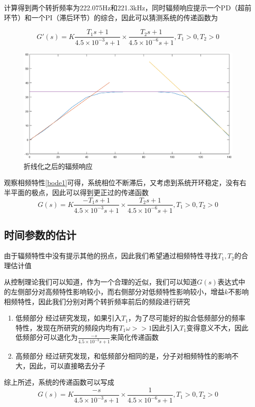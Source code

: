 \documentclass[UTF8,a4paper]{paper}
\begin{document}
计算得到两个转折频率为222.075Hz和221.3kHz，同时辐频响应提示一个PD（超前环节）和一个PI（滞后环节）的综合，因此可以猜测系统的传递函数为

\begin{equation}
G'(s)=K\frac{T_1s+1}{4.5\times10^{-3}s+1}\times\frac{T_2s+1}{4.5\times10^{-6}s+1}, T_1>0,T_2>0
\end{equation}
\begin{figure}
\includegraphics[width=\textwidth]{bode1.eps}
\caption{折线化之后的辐频响应}
\label{refin1}
\end{figure}
观察相频特性\ref{bode1}可得，系统相位不断滞后，又考虑到系统开环稳定，没有右半平面的极点，因此可以得到更正过的传递函数
\begin{equation}
G(s)=K\frac{-T_1s+1}{4.5\times10^{-3}s+1}\times\frac{T_2s+1}{4.5\times10^{-6}s+1}, T_1>0,T_2>0
\end{equation}
\subsection{时间参数的估计}
由于辐频特性中没有提示其他的拐点，因此我们希望通过相频特性寻找$T_1,T_2$的合理估计值

从控制理论我们可以知道，作为一个合理的近似，我们可以知道$G(s)$表达式中的左侧部分对高频特性影响较小，而右侧部分对低频特性影响较小，增益$k$不影响相频特性，因此我们分别对两个转折频率前后的频段进行研究

\begin{enumerate}
\item{低频部分}
经过研究发现，如果引入$T_1$，为了尽可能好的拟合低频部分的频率特性，发现在所研究的频段内均有$T_1\omega >> 1 $因此引入$T_1$变得意义不大，因此低频部分可以退化为$\frac{-s}{4.5\times10^{-3}s+1}$来简化传递函数
\item{高频部分}
经过研究发现，和低频部分相同的是，分子对相频特性的影响不大，因此，可以直接略去分子
\end{enumerate}
综上所述，系统的传递函数可以写成
\begin{equation}
G(s)=K\frac{-s}{4.5\times10^{-3}s+1}\times\frac{1}{4.5\times10^{-6}s+1}, T_1>0,T_2>0
\end{equation}
\end{document}
